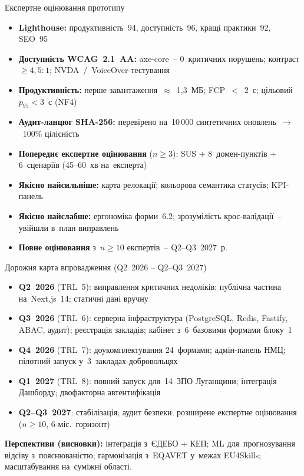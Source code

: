 \documentclass[14pt,aspectratio=169]{beamer}
\begin{document}
\begin{frame}{Експертне оцінювання прототипу}
\begin{itemize}\small
\item \textbf{Lighthouse:} продуктивність~94, доступність~96, кращі практики~92, SEO~95
\item \textbf{Доступність WCAG~2.1~AA:} axe-core~-- 0~критичних порушень; контраст $\geq 4{,}5{:}1$; NVDA~/~VoiceOver-тестування
\item \textbf{Продуктивність:} перше завантаження~$\approx$~1{,}3~МБ; FCP~$<$~2~с; цільовий $p_{95}<3$~с (NF4)
\item \textbf{Аудит-ланцюг SHA-256:} перевірено на~10\,000 синтетичних оновлень~$\to$~100\% цілісність
\item \textbf{Попереднє експертне оцінювання} ($n\geq 3$): SUS + 8~домен-пунктів + 6~сценаріїв (45--60~хв на~експерта)
\item \textbf{Якісно найсильніше:} карта релокації; кольорова семантика статусів; KPI-панель
\item \textbf{Якісно найслабше:} ергономіка форми~6.2; зрозумілість крос-валідації~-- увійшли в~план виправлень
\item \textbf{Повне оцінювання} з~$n\geq 10$ експертів~-- Q2--Q3~2027~р.
\end{itemize}
\end{frame}

\begin{frame}{Дорожня карта впровадження (Q2~2026 -- Q2--Q3~2027)}
\begin{itemize}\small
\item \textbf{Q2~2026} (TRL~5): виправлення критичних недоліків; публічна частина на~Next.js~14; статичні дані вручну
\item \textbf{Q3~2026} (TRL~6): серверна інфраструктура (PostgreSQL, Redis, Fastify, ABAC, аудит); реєстрація закладів; кабінет з~6~базовими формами блоку~1
\item \textbf{Q4~2026} (TRL~7): доукомплектування 24~формами; адмін-панель НМЦ; пілотний запуск у~3~закладах-добровольцях
\item \textbf{Q1~2027} (TRL~8): повний запуск для~14~ЗПО Луганщини; інтеграція Дашборду; двофакторна автентифікація
\item \textbf{Q2--Q3~2027}: стабілізація; аудит безпеки; розширене експертне оцінювання ($n \geq 10$, 6-міс.\ горизонт)
\end{itemize}
\textbf{Перспективи (висновки):} інтеграція з~ЄДЕБО + КЕП; ML для~прогнозування відсіву з~пояснюваністю; гармонізація з~EQAVET у~межах EU4Skills; масштабування на~суміжні області.
\end{frame}
\end{document}
